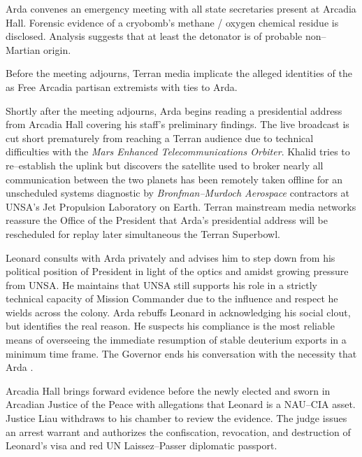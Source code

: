 Arda convenes an emergency meeting with all state secretaries present at Arcadia Hall. Forensic evidence of a cryobomb's methane / oxygen chemical residue is disclosed. Analysis suggests that at least the detonator is of probable non--Martian origin. 

Before the meeting adjourns, Terran media implicate the alleged identities of the  as Free Arcadia partisan extremists with ties to Arda.

Shortly after the meeting adjourns, Arda begins reading a presidential address from Arcadia Hall covering his staff's preliminary findings. The live broadcast is cut short prematurely from reaching a Terran audience due to technical difficulties with the {\it Mars Enhanced Telecommunications Orbiter}. Khalid tries to re--establish the uplink but discovers the satellite used to broker nearly all communication between the two planets has been remotely taken offline for an unscheduled systems diagnostic by {\it Bronfman--Murdoch Aerospace} contractors at UNSA's Jet Propulsion Laboratory on Earth. Terran mainstream media networks reassure the Office of the President that Arda's presidential address will be rescheduled for replay later simultaneous the Terran Superbowl.

Leonard consults with Arda privately and advises him to step down from his political position of President in light of the optics and amidst growing pressure from UNSA. He maintains that UNSA still supports his role in a strictly technical capacity of Mission Commander due to the influence and respect he wields across the colony. Arda rebuffs Leonard in acknowledging his social clout, but identifies the real reason. He suspects his compliance is the most reliable means of overseeing the immediate resumption of stable deuterium exports in a minimum time frame. The Governor ends his conversation with the necessity that Arda .
\StopTimelineDate

Arcadia Hall brings forward evidence before the newly elected and sworn in Arcadian Justice of the Peace with allegations that Leonard is a NAU--CIA asset. Justice Liau withdraws to his chamber to review the evidence. The judge issues an arrest warrant and authorizes the confiscation, revocation, and destruction of Leonard's visa and red UN Laissez--Passer diplomatic passport.


